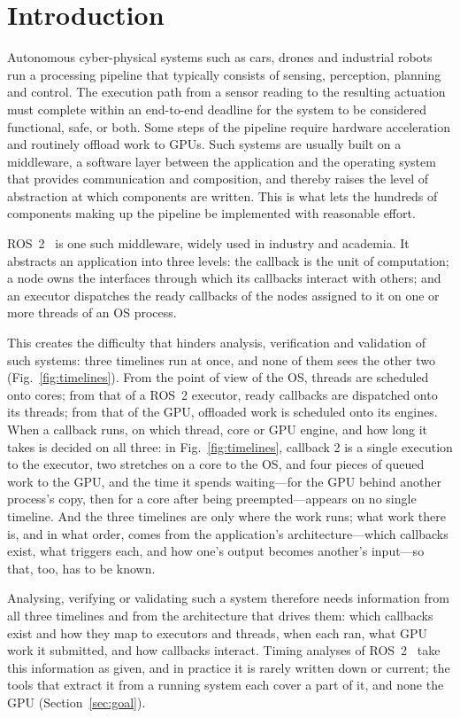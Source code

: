 \section{Introduction}
\label{sec:intro}
Autonomous cyber-physical systems such as cars, drones and industrial robots run a processing pipeline that typically consists of sensing, perception, planning and control. The execution path from a sensor reading to the resulting actuation must complete within an end-to-end deadline for the system to be considered functional, safe, or both. Some steps of the pipeline require hardware acceleration and routinely offload work to GPUs. Such systems are usually built on a middleware, a software layer between the application and the operating system that provides communication and composition, and thereby raises the level of abstraction at which components are written. This is what lets the hundreds of components making up the pipeline be implemented with reasonable effort.

ROS~2~\cite{ros2-standard} is one such middleware, widely used in industry and academia. It abstracts an application into three levels: the callback is the unit of computation; a node owns the interfaces through which its callbacks interact with others; and an executor dispatches the ready callbacks of the nodes assigned to it on one or more threads of an OS process.

This creates the difficulty that hinders analysis, verification and validation of such systems: three timelines run at once, and none of them sees the other two (Fig.~\ref{fig:timelines}). From the point of view of the OS, threads are scheduled onto cores; from that of a ROS~2 executor, ready callbacks are dispatched onto its threads; from that of the GPU, offloaded work is scheduled onto its engines. When a callback runs, on which thread, core or GPU engine, and how long it takes is decided on all three: in Fig.~\ref{fig:timelines}, callback 2 is a single execution to the executor, two stretches on a core to the OS, and four pieces of queued work to the GPU, and the time it spends waiting---for the GPU behind another process's copy, then for a core after being preempted---appears on no single timeline. And the three timelines are only where the work runs; what work there is, and in what order, comes from the application's architecture---which callbacks exist, what triggers each, and how one's output becomes another's input---so that, too, has to be known.

Analysing, verifying or validating such a system therefore needs information from all three timelines and from the architecture that drives them: which callbacks exist and how they map to executors and threads, when each ran, what GPU work it submitted, and how callbacks interact. Timing analyses of ROS~2~\cite{casini-19-reservationbased,arafat-2026-mtexecutor-cbgroups,teper-2024-end2endmtexecutoranalysisoptimization} take this information as given, and in practice it is rarely written down or current; the tools that extract it from a running system each cover a part of it, and none the GPU (Section~\ref{sec:goal}).

